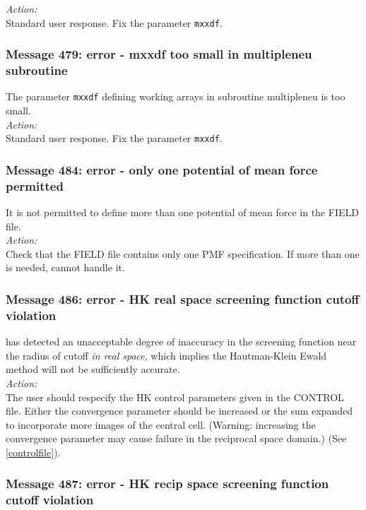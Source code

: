 \noindent
{\em Action:}\\ Standard user response. Fix the parameter {\tt mxxdf}.

\subsubsection*{Message 479: error - mxxdf too small in multipleneu subroutine}

The parameter {\tt mxxdf} defining working arrays in subroutine {\sc
multipleneu} is too small. \\

\noindent
{\em Action:}\\ Standard user response. Fix the parameter {\tt mxxdf}.

\subsubsection*{Message 484: error - only one potential of mean force
permitted}

It is not permitted to define more than one potential of mean force in
the FIELD file. \\

\noindent
{\em Action:} \\
Check that the FIELD file contains only one PMF specification. If more
than one is needed, \D{} cannot handle it.

\subsubsection*{Message 486: error - HK real space screening function 
cutoff violation}

\D{} has detected an unacceptable degree of inaccuracy in the screening
function near the radius of cutoff {\em in real space}, which implies
the Hautman-Klein Ewald method will not be sufficiently accurate. \\

\noindent
{\em Action:} \\
The user should respecify the HK control parameters given in the
CONTROL file. Either the convergence parameter should be increased or
the sum expanded to incorporate more images of the central
cell. (Warning: increasing the convergence parameter may cause failure in
the reciprocal space domain.) (See \ref{controlfile}).

\subsubsection*{Message 487: error - HK recip space screening function 
cutoff violation}

